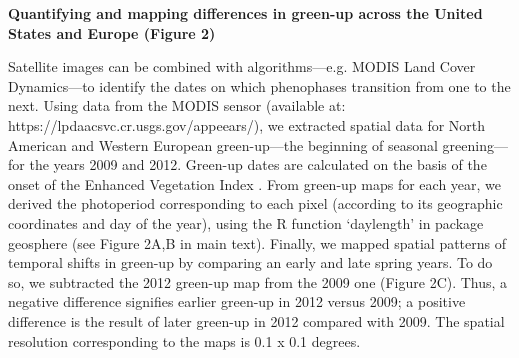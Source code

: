 \documentclass{article}
\begin{document}
\par \textbf{Quantifying and mapping differences in green-up across the United States and Europe (Figure 2)}
\par Satellite images can be combined with algorithms---e.g. MODIS Land Cover Dynamics---to identify the dates on which phenophases transition from one to the next. Using data from the MODIS sensor (available at:  https://lpdaacsvc.cr.usgs.gov/appeears/), we extracted spatial data for North American and Western European green-up---the beginning of seasonal greening---for the years 2009 and 2012. Green-up dates are calculated on the basis of the onset of the Enhanced Vegetation Index \citep{huete2002}. From green-up maps for each year, we derived the photoperiod corresponding to each pixel (according to its geographic coordinates and day of the year), using the R function `daylength' in package geosphere (see Figure 2A,B in main text). Finally, we mapped spatial patterns of temporal shifts in green-up by comparing an early and late spring years. To do so, we subtracted the 2012 green-up map from the 2009 one (Figure 2C). Thus, a negative difference signifies earlier green-up in 2012 versus 2009;  a positive difference is the result of later green-up in 2012 compared with 2009. The spatial resolution corresponding to the maps is 0.1 x 0.1 degrees.
\end{document}
